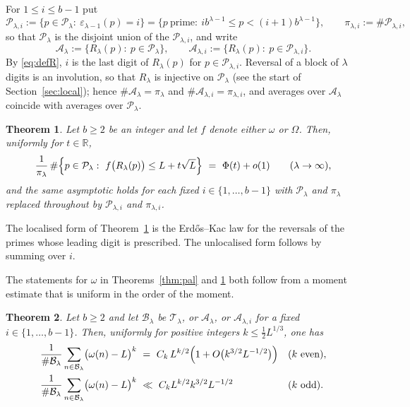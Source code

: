 \documentclass[11pt,a4paper]{article}
\theoremstyle{plain}
\newtheorem{theorem}{Theorem}[section]
\theoremstyle{definition}
\newcommand{\eps}{\varepsilon}
\numberwithin{equation}{section}
\begin{document}
For $1\le i\le b-1$ put
\[
\mathcal P_{\lambda,i}:=\bigl\{p\in\mathcal P_\lambda:\ \eps_{\lambda-1}(p)=i\bigr\}
=\bigl\{p\ \text{prime}:\ ib^{\lambda-1}\le p<(i+1)b^{\lambda-1}\bigr\},
\qquad \pi_{\lambda,i}:=\#\mathcal P_{\lambda,i},
\]
so that $\mathcal P_\lambda$ is the disjoint union of the $\mathcal P_{\lambda,i}$, and write
\begin{equation}\label{eq:defA}
\mathcal A_\lambda:=\bigl\{R_\lambda(p):\ p\in\mathcal P_\lambda\bigr\},\qquad
\mathcal A_{\lambda,i}:=\bigl\{R_\lambda(p):\ p\in\mathcal P_{\lambda,i}\bigr\}.
\end{equation}
By \eqref{eq:defR}, $i$ is the last digit of $R_\lambda(p)$ for $p\in\mathcal P_{\lambda,i}$.
Reversal of a block of $\lambda$ digits is an involution, so that $R_\lambda$ is injective on
$\mathcal P_\lambda$ (see the start of Section~\ref{sec:local}); hence
$\#\mathcal A_\lambda=\pi_\lambda$ and $\#\mathcal A_{\lambda,i}=\pi_{\lambda,i}$, and averages over
$\mathcal A_\lambda$ coincide with averages over $\mathcal P_\lambda$.

\begin{theorem}\label{thm:main}
Let $b\ge2$ be an integer and let $f$ denote either $\omega$ or $\Omega$. Then, uniformly for
$t\in\mathbb R$,
\[
\frac{1}{\pi_\lambda}\,
\#\Bigl\{p\in\mathcal P_\lambda:\ f\bigl(R_\lambda(p)\bigr)\le L+t\sqrt L\Bigr\}\ =\ \Phi(t)+o(1)
\qquad(\lambda\to\infty),
\]
and the same asymptotic holds for each fixed $i\in\{1,\dots,b-1\}$ with $\mathcal P_\lambda$ and
$\pi_\lambda$ replaced throughout by $\mathcal P_{\lambda,i}$ and $\pi_{\lambda,i}$.
\end{theorem}

The localised form of Theorem~\ref{thm:main} is the Erd\H os--Kac law for the reversals of the primes
whose leading digit is prescribed. The unlocalised form follows by summing over $i$.

The statements for $\omega$ in Theorems~\ref{thm:pal} and \ref{thm:main} both follow from a moment
estimate that is uniform in the order of the moment.

\begin{theorem}\label{thm:moments}
Let $b\ge2$ and let $\mathcal B_\lambda$ be $\mathcal T_\lambda$, or $\mathcal A_\lambda$, or
$\mathcal A_{\lambda,i}$ for a fixed $i\in\{1,\dots,b-1\}$. Then, uniformly for positive integers
$k\le\tfrac12L^{1/3}$, one has
\[
\begin{aligned}
\frac1{\#\mathcal B_\lambda}\sum_{n\in\mathcal B_\lambda}\bigl(\omega(n)-L\bigr)^{k}
  &\ =\ C_k\,L^{k/2}\Bigl(1+O\bigl(k^{3/2}L^{-1/2}\bigr)\Bigr) && (k\ \text{even}),\\
\frac1{\#\mathcal B_\lambda}\sum_{n\in\mathcal B_\lambda}\bigl(\omega(n)-L\bigr)^{k}
  &\ \ll\ C_kL^{k/2}k^{3/2}L^{-1/2}                            && (k\ \text{odd}).
\end{aligned}
\]
\end{theorem}
\end{document}

